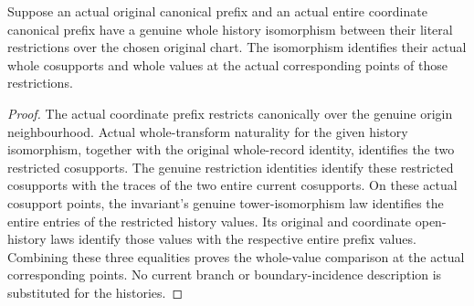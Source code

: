 \begin{lemma}
\label{hir:general-nc-actual-chart-history-whole-value-and-cosupport}
Suppose an actual original canonical prefix and an actual entire
coordinate canonical prefix have a genuine whole history isomorphism
between their literal restrictions over the chosen original chart.
The isomorphism identifies their actual whole cosupports and whole
values at the actual corresponding points of those restrictions.
\leanok
{}
\end{lemma}
\begin{proof}
The actual coordinate prefix restricts canonically over the genuine
origin neighbourhood. Actual whole-transform naturality for the given
history isomorphism, together with the original whole-record identity,
identifies the two restricted cosupports. The genuine restriction
identities identify these restricted cosupports with the traces of
the two entire current cosupports. On these actual cosupport points,
the invariant's genuine tower-isomorphism law identifies the entire
entries of the restricted history values. Its original and coordinate
open-history laws identify those values with the respective entire
prefix values. Combining these three equalities proves the whole-value
comparison at the actual corresponding points. No current branch or
boundary-incidence description is substituted for the histories.
\end{proof}


